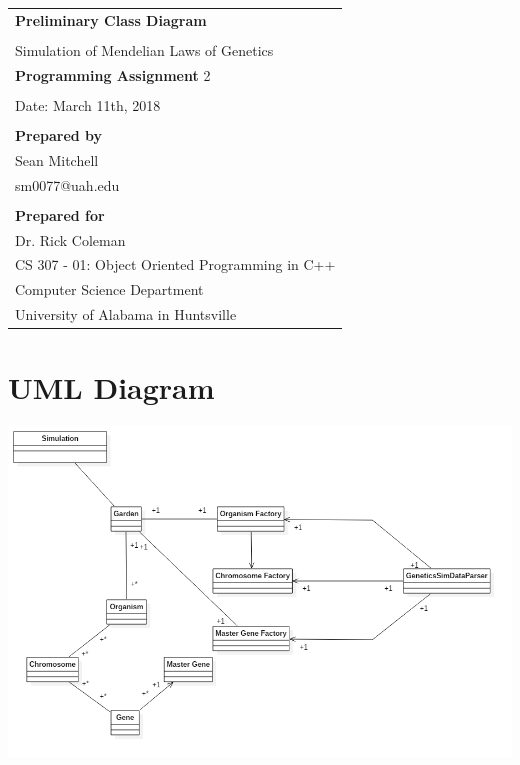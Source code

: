 \documentclass{article}
\begin{document}
\begin{center}
\begin{tabular}{l}

\textbf{Preliminary Class Diagram}\\
\\
Simulation of Mendelian Laws of Genetics\\
\textbf{Programming Assignment} 2\\
\\

Date: March 11th, 2018\\
\\
\textbf{Prepared by}\\
Sean Mitchell\\
sm0077@uah.edu\\
\\

\textbf{Prepared for}\\
Dr. Rick Coleman\\
CS 307 - 01: Object Oriented Programming in C++\\
Computer Science Department\\
University of Alabama in Huntsville\\

\end{tabular}
\end{center}

\newpage
\section{UML Diagram}
\begin{center}
\begin{minipage}{\textwidth}
\includegraphics[width=1\linewidth]{main.png}
\end{minipage}
\end{center}
\end{document}
